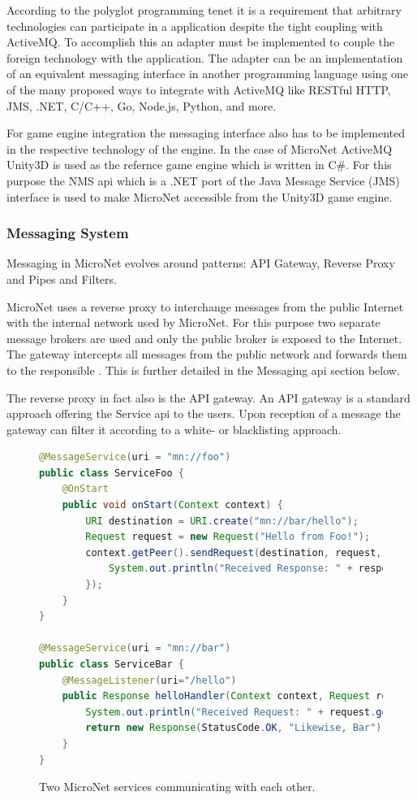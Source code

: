 According to the polyglot programming tenet it is a requirement that arbitrary
technologies can participate in a \ms{} application despite the tight coupling
with ActiveMQ. To accomplish this an adapter must be implemented to couple the
foreign technology with the application. The adapter can be an
implementation of an equivalent messaging interface in another programming
language using one of the many proposed ways to integrate with ActiveMQ like
RESTful HTTP, JMS, .NET, C/C++, Go, Node.js, Python, and more.

For game engine integration the messaging interface also has to be implemented
in the respective technology of the engine. In the case of MicroNet ActiveMQ
Unity3D is used as the refernce game engine which is written in C\#. For this
purpose the NMS \gls{api} which is a .NET port of the Java Message Service (JMS)
interface is used to make MicroNet accessible from the Unity3D game engine.

\subsubsection{Messaging System}

Messaging in MicroNet evolves around patterns: API Gateway, Reverse Proxy and
Pipes and Filters.

MicroNet uses a reverse proxy to interchange messages from the public Internet
with the internal network used by MicroNet. For this purpose two separate
message brokers are used and only the public broker is exposed to the Internet.
The gateway intercepts all messages from the public network and forwards them to
the responsible \ms{}. This is further detailed in the Messaging \gls{api} section
below.

The reverse proxy in fact also is the API gateway. An API gateway is a standard
approach offering the Service \gls{api} to the users. Upon reception of a
message the gateway can filter it according to a white- or blacklisting approach.

\begin{figure}
\begin{lstlisting}[language=Java,firstnumber=1] 
@MessageService(uri = "mn://foo")
public class ServiceFoo {
	@OnStart
	public void onStart(Context context) {
		URI destination = URI.create("mn://bar/hello");
		Request request = new Request("Hello from Foo!");
		context.getPeer().sendRequest(destination, request, response -> {
			System.out.println("Received Response: " + response.getData());
		});
	}
}

@MessageService(uri = "mn://bar")
public class ServiceBar {
	@MessageListener(uri="/hello")
	public Response helloHandler(Context context, Request request) {
		System.out.println("Received Request: " + request.getData());
		return new Response(StatusCode.OK, "Likewise, Bar");
	}
}
\end{lstlisting}
\caption{Two MicroNet services communicating with each other.}
\label{lst:service_communication}
\end{figure}

